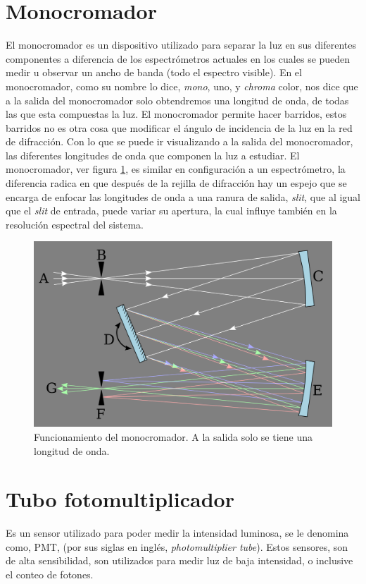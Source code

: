 \section{Monocromador}
El monocromador es un dispositivo utilizado para separar la luz en sus diferentes componentes a diferencia de los espectrómetros actuales en los cuales se pueden medir u observar un ancho de banda (todo el espectro visible). En el monocromador, como su nombre lo dice, \textit{mono}, uno, y \textit{chroma} color, nos dice que a la salida del monocromador solo obtendremos una longitud de onda, de todas las que esta compuestas la luz.
El monocromador permite hacer barridos, estos barridos no es otra cosa que modificar el
ángulo de incidencia de la luz en la red de difracción. Con lo que se puede ir visualizando a la salida del monocromador, las diferentes longitudes de onda que componen la luz a estudiar. El monocromador, ver figura \ref{fig:1280px-czerny-turnermonochromator}, es similar en configuración a un espectrómetro, la diferencia radica en que después de la rejilla de difracción hay un espejo que se encarga de enfocar las longitudes de onda a una ranura de salida, \textit{slit}, que al igual que el \textit{slit} de entrada, puede variar su apertura, la cual influye también en la resolución espectral del sistema.
\begin{figure}[h]
	\centering
	\includegraphics[width=0.4\linewidth]{Imagenes/1280px-Czerny-Turner_Monochromator}
	\caption{Funcionamiento del monocromador. A la salida solo se tiene una longitud de onda. \cite{Czerny-Turney-Conf}}
	\label{fig:1280px-czerny-turnermonochromator}
	
\end{figure}



\section{Tubo fotomultiplicador}
Es un sensor utilizado para poder medir la intensidad luminosa, se le denomina como, PMT, (por sus siglas en inglés, \textit{photomultiplier tube}). Estos sensores, son de alta sensibilidad, son utilizados para medir luz de baja intensidad, o inclusive el conteo de fotones. 

